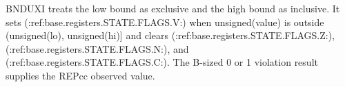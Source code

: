 BNDUXI treats the low bound as exclusive and the high bound as inclusive. It sets (:ref:base.registers.STATE.FLAGS.V:) when unsigned(value) is outside (unsigned(lo), unsigned(hi)] and clears (:ref:base.registers.STATE.FLAGS.Z:), (:ref:base.registers.STATE.FLAGS.N:), and (:ref:base.registers.STATE.FLAGS.C:). The B-sized 0 or 1 violation result supplies the REPcc observed value.
